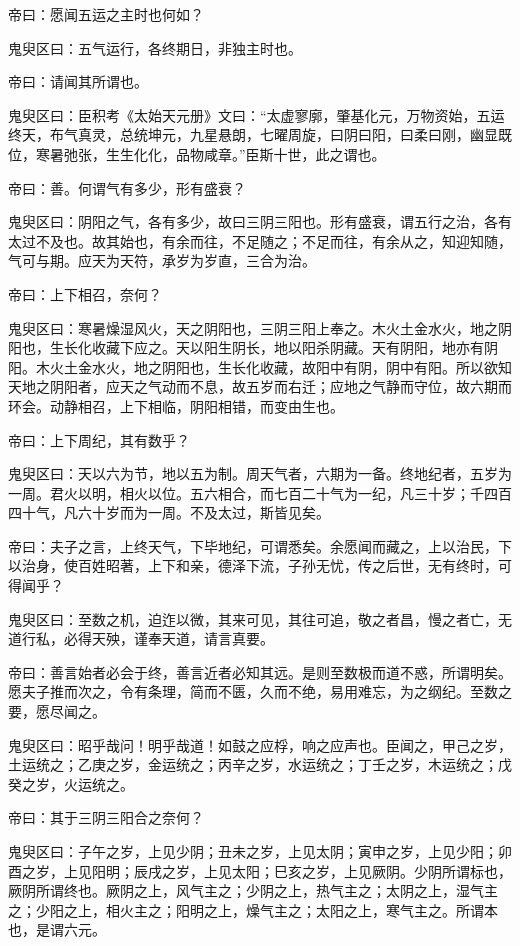 \documentclass{article}%
\begin{document}
帝曰：愿闻五运之主时也何如？

鬼臾区曰：五气运行，各终期日，非独主时也。

帝曰：请闻其所谓也。

鬼臾区曰：臣积考《太始天元册》文曰：“太虚寥廓，肇基化元，万物资始，五运终天，布气真灵，总统坤元，九星悬朗，七曜周旋，曰阴曰阳，曰柔曰刚，幽显既位，寒暑弛张，生生化化，品物咸章。”臣斯十世，此之谓也。

帝曰：善。何谓气有多少，形有盛衰？

鬼臾区曰：阴阳之气，各有多少，故曰三阴三阳也。形有盛衰，谓五行之治，各有太过不及也。故其始也，有余而往，不足随之；不足而往，有余从之，知迎知随，气可与期。应天为天符，承岁为岁直，三合为治。

帝曰：上下相召，奈何？

鬼臾区曰：寒暑燥湿风火，天之阴阳也，三阴三阳上奉之。木火土金水火，地之阴阳也，生长化收藏下应之。天以阳生阴长，地以阳杀阴藏。天有阴阳，地亦有阴阳。木火土金水火，地之阴阳也，生长化收藏，故阳中有阴，阴中有阳。所以欲知天地之阴阳者，应天之气动而不息，故五岁而右迁；应地之气静而守位，故六期而环会。动静相召，上下相临，阴阳相错，而变由生也。

帝曰：上下周纪，其有数乎？

鬼臾区曰：天以六为节，地以五为制。周天气者，六期为一备。终地纪者，五岁为一周。君火以明，相火以位。五六相合，而七百二十气为一纪，凡三十岁；千四百四十气，凡六十岁而为一周。不及太过，斯皆见矣。

帝曰：夫子之言，上终天气，下毕地纪，可谓悉矣。余愿闻而藏之，上以治民，下以治身，使百姓昭著，上下和亲，德泽下流，子孙无忧，传之后世，无有终时，可得闻乎？

鬼臾区曰：至数之机，迫迮以微，其来可见，其往可追，敬之者昌，慢之者亡，无道行私，必得天殃，谨奉天道，请言真要。

帝曰：善言始者必会于终，善言近者必知其远。是则至数极而道不惑，所谓明矣。愿夫子推而次之，令有条理，简而不匮，久而不绝，易用难忘，为之纲纪。至数之要，愿尽闻之。

鬼臾区曰：昭乎哉问！明乎哉道！如鼓之应桴，响之应声也。臣闻之，甲己之岁，土运统之；乙庚之岁，金运统之；丙辛之岁，水运统之；丁壬之岁，木运统之；戊癸之岁，火运统之。

帝曰：其于三阴三阳合之奈何？

鬼臾区曰：子午之岁，上见少阴；丑未之岁，上见太阴；寅申之岁，上见少阳；卯酉之岁，上见阳明；辰戌之岁，上见太阳；巳亥之岁，上见厥阴。少阴所谓标也，厥阴所谓终也。厥阴之上，风气主之；少阴之上，热气主之；太阴之上，湿气主之；少阳之上，相火主之；阳明之上，燥气主之；太阳之上，寒气主之。所谓本也，是谓六元。
\end{document}
